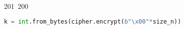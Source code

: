 201~200~\documentclass{article}
\begin{document}
\begin{lstlisting}[language=Python, caption=Signature for Chall 3]
	                                                                        	                                                                    	                                	                    	                    	                        	                        	                    	                                                                	                	                                                                    	                    							                                                                                                                                                                                                    		                                                                                                            k = int.from_bytes(cipher.encrypt(b"\x00"*size_n))
	                                                                        	                                                                    	                                	                    	                    	                        	                        	                    	                                                                	                	                                                                    	                    							                                                                                                                                                                                                    		                                                                                                                (x1,y1) = (k*G).xy()
	                                                                        	                                                                    	                                	                    	                    	                        	                        	                    	                                                                	                	                                                                    	                    							                                                                                                                                                                                                    		                                                                                                                    r = F(x1)
	                                                                        	                                                                    	                                	                    	                    	                        	                        	                    	                                                                	                	                                                                    	                    							                                                                                                                                                                                                    		                                                                                                                        return (r, (F(h(m)) +a * r) /F(k))

\end{lstlisting}
\end{document}
